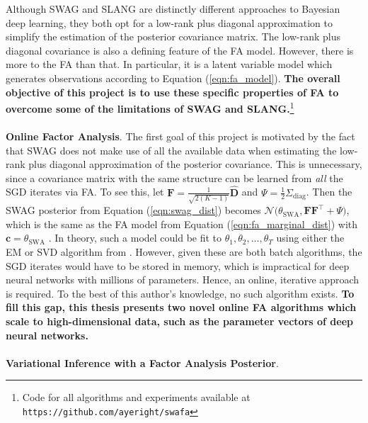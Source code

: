 \documentclass[msc,deptreport.inf]{infthesis} %
\newcommand{\matr}[1]{\mathbf{#1}}
\begin{document}
Although SWAG and SLANG are distinctly different approaches to Bayesian deep learning, they both opt for a low-rank plus diagonal approximation to simplify the estimation of the posterior covariance matrix. The low-rank plus diagonal covariance is also a defining feature of the FA model. However, there is more to the FA than that. In particular, it is a latent variable model which generates observations according to Equation (\ref{eqn:fa_model}). \textbf{The overall objective of this project is to use these specific properties of FA to overcome some of the limitations of SWAG and SLANG.}\footnote{Code for all algorithms and experiments available at \texttt{https://github.com/ayeright/swafa}}
\\ \\
\textbf{Online Factor Analysis}.
The first goal of this project is motivated by the fact that SWAG does not make use of all the available data when estimating the low-rank plus diagonal approximation of the posterior covariance. This is unnecessary, since a covariance matrix with the same structure can be learned from \emph{all} the SGD iterates via FA. To see this, let $\matr{F} = \frac{1}{\sqrt{2(K-1)}} \hat{\matr{D}}$ and $\Psi = \frac{1}{2} \Sigma_\text{diag}$. Then the SWAG posterior from Equation (\ref{eqn:swag_dist}) becomes $\mathcal{N}\big(\theta_\text{SWA}, \matr{FF}^{\intercal} + \Psi\big)$,
which is the same as the FA model from Equation (\ref{eqn:fa_marginal_dist}) with $\matr{c} = \theta_\text{SWA}$ \cite{brownlie2021}. In theory, such a model could be fit to $\theta_1, \theta_2, \dots, \theta_T$ using either the EM or SVD algorithm from \cite{barber2007}. However, given these are both batch algorithms, the SGD iterates would have to be stored in memory, which is impractical for deep neural networks with millions of parameters. Hence, an online, iterative approach is required. To the best of this author's knowledge, no such algorithm exists. \textbf{To fill this gap, this thesis presents two novel online FA algorithms which scale to high-dimensional data, such as the parameter vectors of deep neural networks.}
\\ \\
\textbf{Variational Inference with a Factor Analysis Posterior}.
\end{document}
